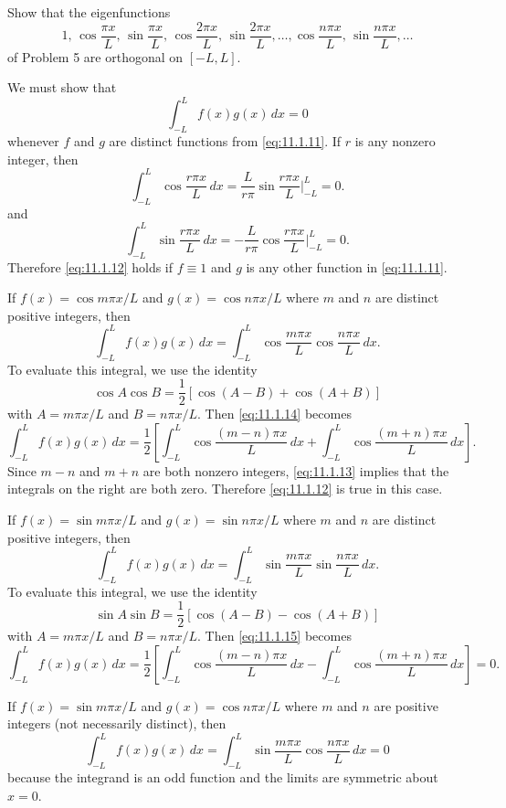 \setcounter{example}{3}
\setcounter{equation}{10}
\begin{example}
  \label{example:11.1.4} \rm Show that the eigenfunctions
  \begin{equation}
    \label{eq:11.1.11}1,\,\cos\frac{\pi x}{L},\,\sin\frac{\pi x}{L}, \,\cos\frac{2\pi x}{L},\,\sin\frac{2\pi x}{L},\dots, \cos\frac{n\pi x}{L},\,\sin\frac{n\pi x}{L},\dots
  \end{equation}
  of Problem 5 are orthogonal on $[-L,L]$.
\end{example}
\setcounter{equation}{11}
\begin{examplesolution}
\solution We must show that
\begin{equation}
  \label{eq:11.1.12}\int_{-L}^{L}f(x)g(x)\,dx=0
\end{equation}
whenever $f$ and $g$ are distinct functions from \eqref{eq:11.1.11}. If $r$ is any nonzero integer,
then
\begin{equation}
  \label{eq:11.1.13}\int_{-L}^{L}\cos\frac{r\pi x}{L}\,dx =\frac{L}{r\pi}\sin\frac{r\pi x}{L}\bigg|_{-L}^{L}=0.
\end{equation}
and
\[
  \int_{-L}^{L}\sin\frac{r\pi x}{L}\,dx =-\frac{L}{r\pi}\cos\frac{r\pi x}{L}\bigg|_{-L}^{L}=0.
\]
Therefore \eqref{eq:11.1.12} holds if $f\equiv1$ and $g$ is any other function in
\eqref{eq:11.1.11}.

If $f(x)=\cos m\pi x/L$ and $g(x)=\cos n\pi x/L$ where $m$ and $n$ are distinct positive integers,
then
\begin{equation}
  \label{eq:11.1.14}\int_{-L}^{L}f(x)g(x)\,dx=\int_{-L}^{L}\cos\frac{m\pi x}{L}\cos\frac{n\pi x}{L}\,dx.
\end{equation}
To evaluate this integral, we use the identity
\[
  \cos A\cos B=\frac{1}{2}[\cos(A-B)+\cos(A+B)]
\]
with $A=m\pi x/L$ and $B=n\pi x/L$. Then \eqref{eq:11.1.14} becomes
\[
  \int_{-L}^{L}f(x)g(x)\,dx=\frac{1}{2}\left[\int_{-L}^{L}\cos\frac{(m-n)\pi x}{L}\,dx +\int_{-L}^{L}\cos\frac{(m+n)\pi x}{L}\,dx\right].
\]
Since $m-n$ and $m+n$ are both nonzero integers, \eqref{eq:11.1.13} implies that the integrals on
the right are both zero. Therefore \eqref{eq:11.1.12} is true in this case.

If $f(x)=\sin m\pi x/L$ and $g(x)=\sin n\pi x/L$ where $m$ and $n$ are distinct positive integers,
then
\begin{equation}
  \label{eq:11.1.15}\int_{-L}^{L}f(x)g(x)\,dx=\int_{-L}^{L}\sin\frac{m\pi x}{L}\sin\frac{n\pi x}{L}\,dx.
\end{equation}
To evaluate this integral, we use the identity
\[
  \sin A\sin B=\frac{1}{2}[\cos(A-B)-\cos(A+B)]
\]
with $A=m\pi x/L$ and $B=n\pi x/L$. Then \eqref{eq:11.1.15} becomes
\[
  \int_{-L}^{L}f(x)g(x)\,dx=\frac{1}{2}\left[\int_{-L}^{L}\cos\frac{(m-n)\pi x}{L}\,dx -\int_{-L}^{L}\cos\frac{(m+n)\pi x}{L}\,dx\right]=0.
\]

If $f(x)=\sin m\pi x/L$ and $g(x)=\cos n\pi x/L$ where $m$ and $n$ are positive integers (not
necessarily distinct), then
\[
  \int_{-L}^{L}f(x)g(x)\,dx=\int_{-L}^{L}\sin\frac{m\pi x}{L}\cos\frac{n\pi x}{L}\,dx=0
\]
because the integrand is an odd function and the limits are symmetric about $x=0$. \bbox
\end{examplesolution}

